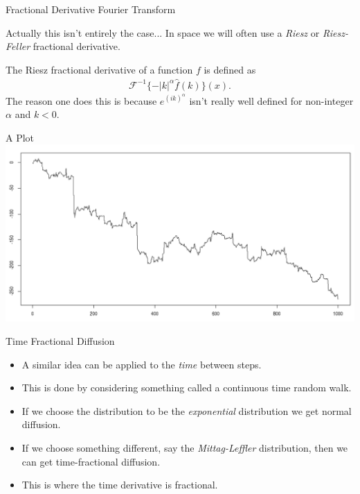 \documentclass[pdf]{beamer}
\begin{document}
\begin{frame}{Fractional Derivative Fourier Transform}

    Actually this isn't entirely the case...
    In space we will often use a \emph{Riesz} or \emph{Riesz-Feller} fractional derivative. 
    
    The Riesz fractional derivative of a function $ f $ is defined as 
    \begin{align}
        \mathcal{F}^{-1}\{-|k|^\alpha \hat{f}(k) \}(x).
    \end{align}
    The reason one does this is because $ e^{(ik)^\alpha} $ isn't really well defined for non-integer $ \alpha $ and $ k < 0 $. 
\end{frame}

\begin{frame}{A Plot}
	\includegraphics[scale=0.3]{stableProcess} 
\end{frame}


\begin{frame}{Time Fractional Diffusion}
    \begin{itemize}
        \item A similar idea can be applied to the \emph{time} between steps. 
        \item This is done by considering something called a continuous time random walk.
        \item If we choose the distribution to be the \emph{exponential} distribution we get normal diffusion.
        \item If we choose something different, say the \emph{Mittag-Leffler} distribution, then we can get time-fractional diffusion.
        \item This is where the time derivative is fractional.
    \end{itemize}
\end{frame}
	
\end{document}
